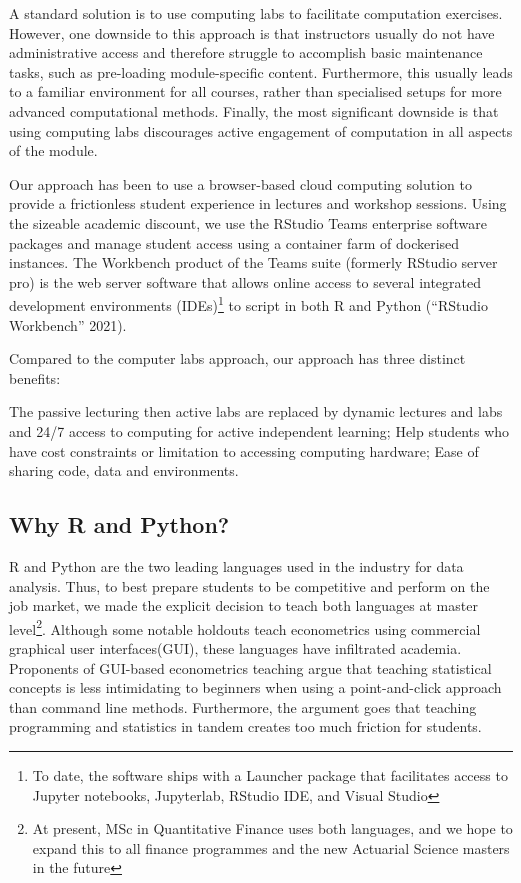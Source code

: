 \documentclass{article}
\begin{document}
A standard solution is to use computing labs to facilitate computation
exercises. However, one downside to this approach is that instructors
usually do not have administrative access and therefore struggle to
accomplish basic maintenance tasks, such as pre-loading module-specific
content. Furthermore, this usually leads to a familiar environment for
all courses, rather than specialised setups for more advanced
computational methods. Finally, the most significant downside is that
using computing labs discourages active engagement of computation in all
aspects of the module.

Our approach has been to use a browser-based cloud computing solution to
provide a frictionless student experience in lectures and workshop
sessions. Using the sizeable academic discount, we use the RStudio Teams
enterprise software packages and manage student access using a container
farm of dockerised instances. The Workbench product of the Teams suite
(formerly RStudio server pro) is the web server software that allows
online access to several integrated development environments
(IDEs)\footnote{To date, the software ships with a Launcher package that
  facilitates access to Jupyter notebooks, Jupyterlab, RStudio IDE, and
  Visual Studio} to script in both R and Python ({``{RStudio}
Workbench''} 2021).

Compared to the computer labs approach, our approach has three distinct
benefits:

The passive lecturing then active labs are replaced by dynamic lectures
and labs and 24/7 access to computing for active independent learning;
Help students who have cost constraints or limitation to accessing
computing hardware; Ease of sharing code, data and environments.

\hypertarget{why-r-and-python}{%
\subsection{Why R and Python?}\label{why-r-and-python}}

R and Python are the two leading languages used in the industry for data
analysis. Thus, to best prepare students to be competitive and perform
on the job market, we made the explicit decision to teach both languages
at master level\footnote{At present, MSc in Quantitative Finance uses
  both languages, and we hope to expand this to all finance programmes
  and the new Actuarial Science masters in the future}. Although some
notable holdouts teach econometrics using commercial graphical user
interfaces(GUI), these languages have infiltrated academia. Proponents
of GUI-based econometrics teaching argue that teaching statistical
concepts is less intimidating to beginners when using a point-and-click
approach than command line methods. Furthermore, the argument goes that
teaching programming and statistics in tandem creates too much friction
for students.
\end{document}
